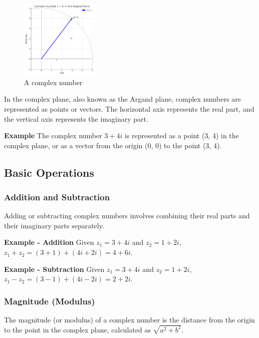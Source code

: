 \documentclass[
]{article}
\begin{document}
\begin{figure}
\centering
\includegraphics[width=0.33\textwidth,height=\textheight]{complex-number.png}
\caption{A complex number}
\end{figure}

In the complex plane, also known as the Argand plane, complex numbers
are represented as points or vectors. The horizontal axis represents the
real part, and the vertical axis represents the imaginary part.

\textbf{Example} The complex number \(3 + 4i\) is represented as a point
(3, 4) in the complex plane, or as a vector from the origin (0, 0) to
the point (3, 4).

\subsection{Basic Operations}\label{basic-operations}

\subsubsection{Addition and Subtraction}\label{addition-and-subtraction}

Adding or subtracting complex numbers involves combining their real
parts and their imaginary parts separately.

\textbf{Example - Addition} Given \(z_1 = 3 + 4i\) and \(z_2 = 1 + 2i\),
\(z_1 + z_2 = (3 + 1) + (4i + 2i) = 4 + 6i\).

\textbf{Example - Subtraction} Given \(z_1 = 3 + 4i\) and
\(z_2 = 1 + 2i\), \(z_1 - z_2 = (3 - 1) + (4i - 2i) = 2 + 2i\).

\subsubsection{Magnitude (Modulus)}\label{magnitude-modulus}

The magnitude (or modulus) of a complex number is the distance from the
origin to the point in the complex plane, calculated as
\(\sqrt{a^2 + b^2}\).
\end{document}
